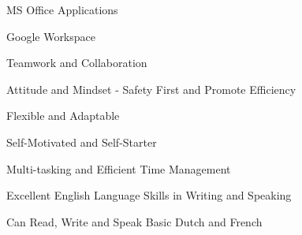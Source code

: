 



\begin{cvparagraph}



\begin{cventries}
  \cventry
{} %
{} %
{} %
{} %
{ %
\begin{cvitems*}
	\item{MS Office Applications}
	\item{Google Workspace}
	\item{Teamwork and Collaboration}
	\item{Attitude and Mindset - Safety First and Promote Efficiency}
	\item{Flexible and Adaptable}
	\item{Self-Motivated and Self-Starter}
	\item{Multi-tasking and Efficient Time Management}
	\item{Excellent English Language Skills in Writing and Speaking}
	\item{Can Read, Write and Speak Basic Dutch and French}
\end{cvitems*}
}
\end{cventries}



\end{cvparagraph}
